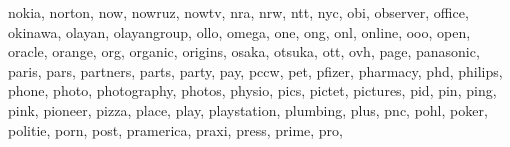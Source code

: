 \documentclass[letterpaper,10pt,english]{sphinxmanual}
\begin{document}
\begin{fulllineitems}
\begin{fulllineitems}
\textquotesingle{}nokia\textquotesingle{}, \textquotesingle{}norton\textquotesingle{}, \textquotesingle{}now\textquotesingle{}, \textquotesingle{}nowruz\textquotesingle{}, \textquotesingle{}nowtv\textquotesingle{}, \textquotesingle{}nra\textquotesingle{}, \textquotesingle{}nrw\textquotesingle{}, \textquotesingle{}ntt\textquotesingle{}, \textquotesingle{}nyc\textquotesingle{}, \textquotesingle{}obi\textquotesingle{}, \textquotesingle{}observer\textquotesingle{}, \textquotesingle{}office\textquotesingle{}, \textquotesingle{}okinawa\textquotesingle{}, \textquotesingle{}olayan\textquotesingle{}, \textquotesingle{}olayangroup\textquotesingle{}, \textquotesingle{}ollo\textquotesingle{}, \textquotesingle{}omega\textquotesingle{}, \textquotesingle{}one\textquotesingle{}, \textquotesingle{}ong\textquotesingle{}, \textquotesingle{}onl\textquotesingle{}, \textquotesingle{}online\textquotesingle{}, \textquotesingle{}ooo\textquotesingle{}, \textquotesingle{}open\textquotesingle{}, \textquotesingle{}oracle\textquotesingle{}, \textquotesingle{}orange\textquotesingle{}, \textquotesingle{}org\textquotesingle{}, \textquotesingle{}organic\textquotesingle{}, \textquotesingle{}origins\textquotesingle{}, \textquotesingle{}osaka\textquotesingle{}, \textquotesingle{}otsuka\textquotesingle{}, \textquotesingle{}ott\textquotesingle{}, \textquotesingle{}ovh\textquotesingle{}, \textquotesingle{}page\textquotesingle{}, \textquotesingle{}panasonic\textquotesingle{}, \textquotesingle{}paris\textquotesingle{}, \textquotesingle{}pars\textquotesingle{}, \textquotesingle{}partners\textquotesingle{}, \textquotesingle{}parts\textquotesingle{}, \textquotesingle{}party\textquotesingle{}, \textquotesingle{}pay\textquotesingle{}, \textquotesingle{}pccw\textquotesingle{}, \textquotesingle{}pet\textquotesingle{}, \textquotesingle{}pfizer\textquotesingle{}, \textquotesingle{}pharmacy\textquotesingle{}, \textquotesingle{}phd\textquotesingle{}, \textquotesingle{}philips\textquotesingle{}, \textquotesingle{}phone\textquotesingle{}, \textquotesingle{}photo\textquotesingle{}, \textquotesingle{}photography\textquotesingle{}, \textquotesingle{}photos\textquotesingle{}, \textquotesingle{}physio\textquotesingle{}, \textquotesingle{}pics\textquotesingle{}, \textquotesingle{}pictet\textquotesingle{}, \textquotesingle{}pictures\textquotesingle{}, \textquotesingle{}pid\textquotesingle{}, \textquotesingle{}pin\textquotesingle{}, \textquotesingle{}ping\textquotesingle{}, \textquotesingle{}pink\textquotesingle{}, \textquotesingle{}pioneer\textquotesingle{}, \textquotesingle{}pizza\textquotesingle{}, \textquotesingle{}place\textquotesingle{}, \textquotesingle{}play\textquotesingle{}, \textquotesingle{}playstation\textquotesingle{}, \textquotesingle{}plumbing\textquotesingle{}, \textquotesingle{}plus\textquotesingle{}, \textquotesingle{}pnc\textquotesingle{}, \textquotesingle{}pohl\textquotesingle{}, \textquotesingle{}poker\textquotesingle{}, \textquotesingle{}politie\textquotesingle{}, \textquotesingle{}porn\textquotesingle{}, \textquotesingle{}post\textquotesingle{}, \textquotesingle{}pramerica\textquotesingle{}, \textquotesingle{}praxi\textquotesingle{}, \textquotesingle{}press\textquotesingle{}, \textquotesingle{}prime\textquotesingle{}, \textquotesingle{}pro\textquotesingle{}, 
\end{fulllineitems}
\end{fulllineitems}
\end{document}
